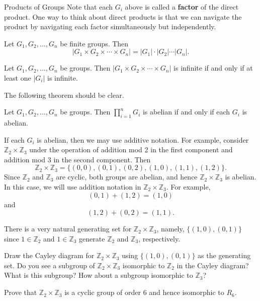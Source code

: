 \begin{section}{Products of Groups}
Note that each \(G_i\) above is called a \textbf{factor} of the direct product.  One way to think about direct products is that we can navigate the product by navigating each factor simultaneously but independently. 

\begin{theorem}
Let \(G_1, G_2,\ldots, G_n\) be finite groups.  Then
\[
|G_1\times G_2\times \cdots \times G_n|=|G_1|\cdot|G_2|\cdots |G_n|.
\]
\end{theorem}

\begin{theorem}
Let \(G_1, G_2,\ldots, G_n\) be groups.  Then \(|G_1\times G_2\times \cdots \times G_n|\) is infinite if and only if at least one \(|G_i|\) is infinite.
\end{theorem}


The following theorem should be clear.

\begin{theorem}\label{thm:product_abelian_groups}
Let \(G_1, G_2,\ldots, G_n\) be groups.  Then \(\prod_{i=1}^nG_i\) is abelian if and only if each \(G_i\) is abelian.
\end{theorem}

If each \(G_i\) is abelian, then we may use additive notation.  For example, consider \(\mathbb{Z}_2\times \mathbb{Z}_3\) under the operation of addition mod 2 in  the first component and addition mod 3 in the second component.  Then
\[
\mathbb{Z}_2\times \mathbb{Z}_3=\{(0,0),(0,1),(0,2),(1,0),(1,1),(1,2)\}.
\]
Since \(\mathbb{Z}_2\) and \(\mathbb{Z}_3\) are cyclic, both groups are abelian, and hence \(\mathbb{Z}_2\times \mathbb{Z}_3\) is abelian.  In this case, we will use addition notation in \(\mathbb{Z}_2\times \mathbb{Z}_3\).  For example,
\[
(0,1)+(1,2)=(1,0)
\]
and
\[
(1,2)+(0,2)=(1,1).
\]

There is a very natural generating set for \(\mathbb{Z}_2\times \mathbb{Z}_3\), namely, \(\{(1,0),(0,1)\}\) since \(1\in \mathbb{Z}_2\) and \(1\in \mathbb{Z}_3\) generate \(\mathbb{Z}_2\) and \(\mathbb{Z}_3\), respectively.

\begin{exercise}
Draw the Cayley diagram for \(\mathbb{Z}_2\times \mathbb{Z}_3\) using \(\{(1,0),(0,1)\}\) as the generating set.  Do you see a subgroup of \(\mathbb{Z}_2\times \mathbb{Z}_3\) isomorphic to \(\mathbb{Z}_2\) in the Cayley diagram?  What is this subgroup?  How about a subgroup isomorphic to \(\mathbb{Z}_3\)?
\end{exercise}

\begin{exercise}
Prove that \(\mathbb{Z}_2\times \mathbb{Z}_3\) is a cyclic group of order 6 and hence isomorphic to \(R_6\).  
\end{exercise}


\end{section}
